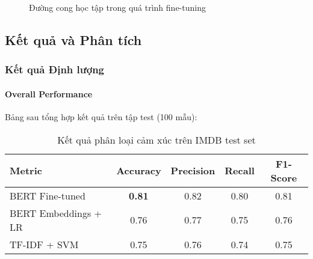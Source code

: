 \begin{figure}[H]
\centering
{}
\caption{Đường cong học tập trong quá trình fine-tuning}
\label{fig:training_curves}
\end{figure}

\subsection{Kết quả và Phân tích}
\label{ssec:ket_qua_phan_tich}

\subsubsection{Kết quả Định lượng}

\paragraph{Overall Performance}
Bảng sau tổng hợp kết quả trên tập test (100 mẫu):

\begin{table}[H]
\centering
\caption{Kết quả phân loại cảm xúc trên IMDB test set}
\label{tab:results_summary}
\begin{tabular}{lcccc}
\toprule
\textbf{Metric} & \textbf{Accuracy} & \textbf{Precision} & \textbf{Recall} & \textbf{F1-Score} \\
\midrule
BERT Fine-tuned & \textbf{0.81} & 0.82 & 0.80 & 0.81 \\
BERT Embeddings + LR & 0.76 & 0.77 & 0.75 & 0.76 \\
TF-IDF + SVM & 0.75 & 0.76 & 0.74 & 0.75 \\
\bottomrule
\end{tabular}
\end{table}

